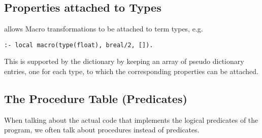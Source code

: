 \subsection{Properties attached to Types}
{\eclipse} allows Macro transformations to be attached to term types, e.g.
\begin{verbatim}
:- local macro(type(float), breal/2, []).
\end{verbatim}
This is supported by the dictionary by keeping an array of pseudo dictionary
entries, one for each type, to which the corresponding properties can
be attached.


\subsection{The Procedure Table (Predicates)}
\label{secproctable}
When talking about the actual code that implements the logical predicates
of the {\eclipse} program, we often talk about procedures instead of
predicates.

